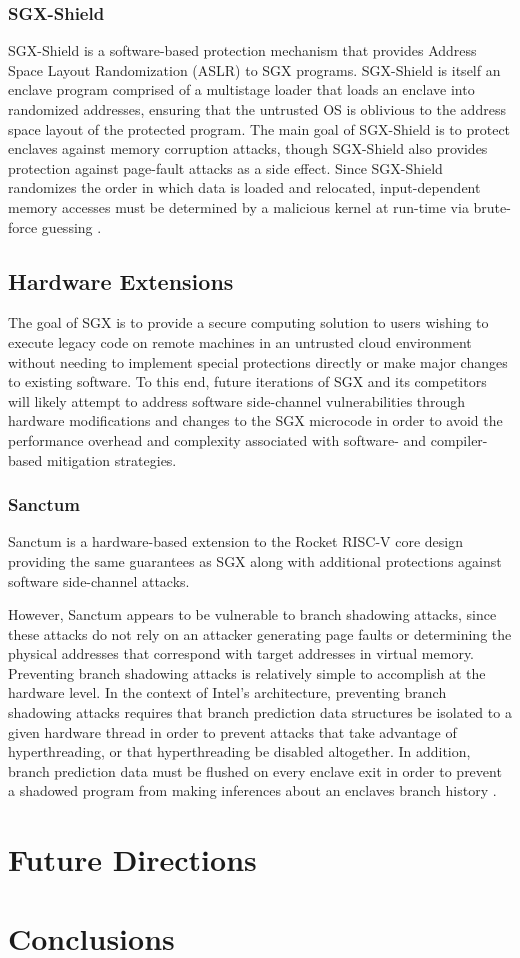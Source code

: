 \subsubsection{SGX-Shield}

SGX-Shield is a software-based protection mechanism that provides Address Space Layout Randomization (ASLR) to SGX programs. SGX-Shield is itself an enclave program comprised of a multistage loader that loads an enclave into randomized addresses, ensuring that the untrusted OS is oblivious to the address space layout of the protected program. The main goal of SGX-Shield is to protect enclaves against memory corruption attacks, though SGX-Shield also provides protection against page-fault attacks as a side effect. Since SGX-Shield randomizes the order in which data is loaded and relocated, input-dependent memory accesses must be determined by a malicious kernel at run-time via brute-force guessing \cite{seo_sgx-shield:_2017}. 

\subsection{Hardware Extensions}

The goal of SGX is to provide a secure computing solution to users wishing to execute legacy code on remote machines in an untrusted cloud environment without needing to implement special protections directly or make major changes to existing software. To this end, future iterations of SGX and its competitors will likely attempt to address software side-channel vulnerabilities through hardware modifications and changes to the SGX microcode in order to avoid the performance overhead and complexity associated with software- and compiler-based mitigation strategies. 

\subsubsection{Sanctum}

Sanctum is a hardware-based extension to the Rocket RISC-V core design providing the same guarantees as SGX along with additional protections against software side-channel attacks. 

However, Sanctum appears to be vulnerable to branch shadowing attacks, since these attacks do not rely on an attacker generating page faults or determining the physical addresses that correspond with target addresses in virtual memory. Preventing branch shadowing attacks is relatively simple to accomplish at the hardware level. In the context of Intel's architecture, preventing branch shadowing attacks requires that branch prediction data structures be isolated to a given hardware thread in order to prevent attacks that take advantage of hyperthreading, or that hyperthreading be disabled altogether. In addition, branch prediction data must be flushed on every enclave exit in order to prevent a shadowed program from making inferences about an enclaves branch history \cite{lee_inferring_2017}.

\section{Future Directions}



\section{Conclusions}
